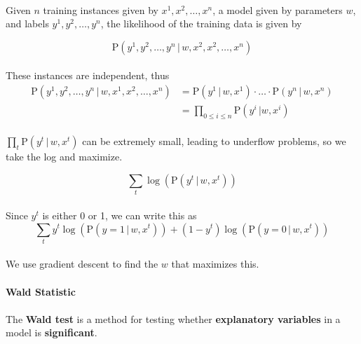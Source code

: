 \documentclass[letterpaper,12pt]{article}
\begin{document}
\paragraph{}Given $n$ training instances given by $x^1, x^2, \ldots, x^n$, a model given by parameters $w$, and labels
$y^1, y^2, \ldots, y^n$, the likelihood of the training data is given by

\[
    \mathrm{P}(y^1, y^2, \ldots, y^n \, | \, w, x^2, x^2, \ldots, x^n)
\]
\paragraph{}These instances are independent, thus
\begin{align*}
    \mathrm{P}(y^1, y^2, \ldots, y^n \, | \, w, x^1, x^2, \ldots, x^n)&=
    \mathrm{P}(y^1 \, | \, w, x^1) \cdot \ldots \cdot \mathrm{P}(y^n \, | \, w, x^n) \\
                                                                      &= \prod_{0\le i \le n} 
                                                                      \mathrm{P}(y^i \, | w, x^i)
\end{align*}
\paragraph{}$\prod_t \mathrm{P}(y^t \, | \, w, x^t)$ can be extremely small, leading to underflow problems, so
we take the log and maximize.

\[
    \sum_t \log( \mathrm{P}(y^t \, | \, w, x^t))
\]
\paragraph{}Since $y^t$ is either 0 or 1, we can write this as
\[
    \sum_t y^t\log(\mathrm{P}(y=1 \, | \, w, x^t)) + (1-y^t)\log(\mathrm{P}(y=0 \, | \, w, x^t))
\]
\paragraph{}We use gradient descent to find the $w$ that maximizes this.
\paragraph{Wald Statistic}
\paragraph{}The \textbf{Wald test} is a method for testing whether \textbf{explanatory variables} in a 
model is \textbf{significant}.
\end{document}
